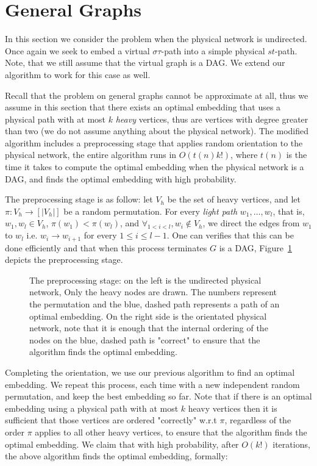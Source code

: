 \documentclass[runningheads]{llncs}
\begin{document}
\section{General Graphs}
\label{sec:general}

In this section we consider the problem when the physical network is undirected.
Once again we seek to embed a virtual $\sigma\tau$-path 
into a simple physical $st$-path.
Note, that we still assume that the virtual graph is a DAG. 
We extend our algorithm to work for this case as well.

Recall that the problem on general graphs cannot be approximate at all,
thus we assume in this section that there exists an optimal embedding that uses
a physical path with at most $k$ \emph{heavy} vertices, thus are vertices with
degree greater than two (we do not assume anything about the physical network).
The modified algorithm includes a preprocessing stage that applies
random orientation to the physical network, the entire algorithm runs in
$O(t(n)k!)$, where $t(n)$ is the time it takes to compute the optimal embedding when the
physical network is a DAG, and finds the optimal embedding with high
probability.

The preprocessing stage is as follow:
let $V_h$ be the set of heavy vertices, and let 
$\pi:V_h \to [|V_h|]$ be a random permutation.
For every \emph{light path} $w_1, \ldots, w_l$, that is, $w_1, w_l \in
V_h$, $\pi(w_1) < \pi(w_l)$, and $\forall_{1 < i < l}, w_i \notin V_h$,
we direct the edges from $w_1$ to $w_l$ i.e. $w_i \to w_{i+1}$ for every $1
\leq i \leq l - 1$.
One can verifies that this can be done efficiently and that when this process
terminates $G$ is a DAG, Figure~\ref{fig:orientation} depicts the preprocessing
stage.

\begin{figure}[ht]

\caption{
\label{fig:orientation}
The preprocessing stage: on the left is the undirected physical network,
Only the heavy nodes are drawn.
The numbers represent the permutation and the blue, dashed path represents a
path of an optimal embedding.
On the right side is the orientated physical network, 
note that it is enough that the internal ordering of the nodes on the blue,
dashed path is "correct" to ensure that the algorithm finds the optimal
embedding. }
\end{figure}

Completing the orientation, we use our previous algorithm to find an optimal
embedding.
We repeat this process, each time with a new independent random permutation, and
keep the best embedding so far.
Note that if there is an optimal embedding using a physical path with at most
$k$ heavy vertices then it is sufficient that those vertices are ordered
"correctly" w.r.t $\pi$, regardless of the order $\pi$ applies to all other
heavy vertices, to ensure that the algorithm finds the optimal embedding.
We claim that with high probability, 
after $O(k!)$ iterations, the above algorithm finds the optimal embedding, formally:
\end{document}
